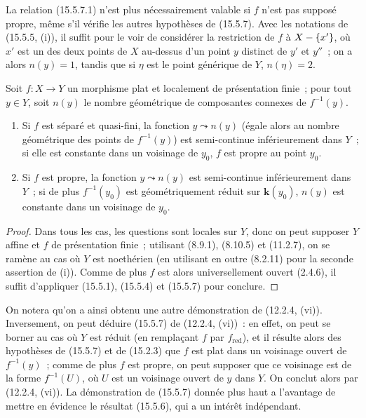 \begin{remark}[15.5.8]
\label{IV.15.5.8-fr}
La relation (15.5.7.1) n'est plus nécessairement valable si $f$ n'est pas supposé propre, même s'il vérifie les autres hypothèses de (15.5.7). Avec les notations de (15.5.5, (i)), il suffit pour le voir de considérer la restriction de $f$ à $X-\{x'\}$, où $x'$ est un des deux points de $X$ au-dessus d'un point $y$ distinct de $y'$ et $y''$~; on a alors $n(y)=1$, tandis que si $\eta$ est le point générique de $Y$, $n(\eta)=2$.
\end{remark}

\begin{proposition}[15.5.9]
\label{IV.15.5.9-fr}
Soit $f:X\to Y$ un morphisme plat et localement de présentation finie~; pour tout $y\in Y$, soit $n(y)$ le nombre géométrique de composantes connexes de $f^{-1}(y)$.
\begin{enumerate}[label=\emph{(\roman*)}]
  \item Si $f$ est séparé et quasi-fini, la fonction $y\leadsto n(y)$ \textup{(égale alors au nombre géométrique des points de $f^{-1}(y)$)} est semi-continue inférieurement dans $Y$~; si elle est constante dans un voisinage de $y_0$, $f$ est propre au point $y_0$.
  \item Si $f$ est propre, la fonction $y\leadsto n(y)$ est semi-continue inférieurement dans $Y$~; si de plus $f^{-1}(y_0)$ est géométriquement réduit sur $\boldsymbol{k}(y_0)$, $n(y)$ est constante dans un voisinage de $y_0$.
\end{enumerate}
\end{proposition}

\begin{proof}
Dans tous les cas, les questions sont locales sur $Y$, donc on peut supposer $Y$ affine et $f$ de présentation finie~; utilisant (8.9.1), (8.10.5) et (11.2.7), on se ramène au cas où $Y$ est noethérien (en utilisant en outre (8.2.11) pour la seconde assertion de (i)). Comme de plus $f$ est alors universellement ouvert (2.4.6), il suffit d'appliquer (15.5.1), (15.5.4) et (15.5.7) pour conclure.
\end{proof}

\begin{remark}[15.5.10]
\label{IV.15.5.10-fr}
On notera qu'on a ainsi obtenu une autre démonstration de (12.2.4, (vi)). Inversement, on peut déduire (15.5.7) de (12.2.4, (vi))~: en effet, on peut se borner au cas où $Y$ est réduit (en remplaçant $f$ par $f_{\mathrm{red}}$), et il résulte alors des hypothèses de (15.5.7) et de (15.2.3) que $f$ est plat dans un voisinage ouvert de $f^{-1}(y)$~; comme de plus $f$ est propre, on peut supposer que ce voisinage est de la forme $f^{-1}(U)$, où $U$ est un voisinage ouvert de $y$ dans $Y$. On conclut alors par (12.2.4, (vi)). La démonstration de (15.5.7) donnée plus haut a l'avantage de mettre en évidence le résultat (15.5.6), qui a un intérêt indépendant.
\end{remark}

